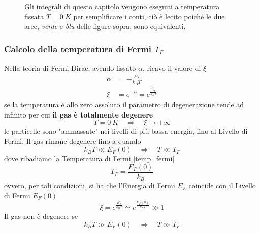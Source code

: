 \begin{figure}[h]
    \centering
    \caption{Gli integrali di questo capitolo vengono eseguiti a temperatura fissata $T=\SI{0}{K}$ per semplificare i conti, ciò è lecito poiché le due aree, \textit{verde} e \textit{blu} delle figure sopra, sono equivalenti.}
    \label{fig_integrali}
\end{figure}


\subsubsection{Calcolo della temperatura di Fermi $T_F$}
Nella teoria di Fermi Dirac, avendo fissato $\alpha$, ricavo il valore di $\xi$
\begin{equation}
\begin{split}
\alpha & = - \frac{E_F}{k_B T} \\
\xi & = e^{ -\alpha } = e^{ \frac{E_F}{k_B T} }
\end{split}
\end{equation}
se la temperatura è allo zero assoluto il parametro di degenerazione tende ad infinito per cui \textbf{il gas è totalmente degenere}
\begin{equation}
T=\SI{0}{K} \quad\Rightarrow\quad \xi \to + \infty
\end{equation}
le particelle sono "ammassate" nei livelli di più bassa energia, fino al Livello di Fermi.
Il gas rimane degenere fino a quando
\begin{equation}
k_B T \ll E_F(0) \quad\Rightarrow\quad T \ll T_F
\end{equation}
dove ribadiamo la Temperatura di Fermi \ref{temp_fermi}
$$T_F= \frac{E_F(0)}{k_B}$$
ovvero, per tali condizioni, si ha che l'Energia di Fermi $E_F$ coincide con il Livello di Fermi $E_F(0)$
\begin{equation}
\xi = e^{ \frac{E_F}{k_B T} } \simeq e^{ \frac{E_F(0)}{k_B T} } \gg 1
\end{equation}
Il gas non è degenere se
\begin{equation}
k_B T \gg E_F(0) \quad\Rightarrow\quad T \gg T_F
\end{equation}

